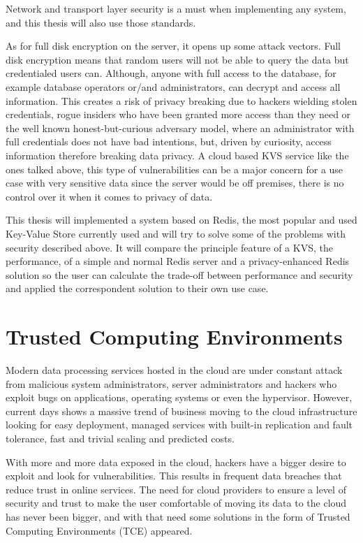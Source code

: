 Network and transport layer security is a must when implementing any system, and this thesis will also use those standards. 

As for full disk encryption on the server, it opens up some attack vectors. Full disk encryption means that random users will not be able to query the data but credentialed users can. Although, anyone with full access to the database, for example database operators or/and administrators, can decrypt and access all information. This creates a risk of privacy breaking due to hackers wielding stolen credentials, rogue insiders who have been granted more access than they need or the well known honest-but-curious adversary model, where an administrator with full credentials does not have bad intentions, but, driven by curiosity, access information therefore breaking data privacy. A cloud based \gls{KVS} service like the ones talked above, this type of vulnerabilities can be a major concern for a use case with very sensitive data since the server would be off premises, there is no control over it when it comes to privacy of data.

This thesis will implemented a system based on Redis, the most popular and used Key-Value Store currently used and will try to solve some of the problems with security described above. It will compare the principle feature of a \gls{KVS}, the performance, of a simple and normal Redis server and a privacy-enhanced Redis solution so the user can calculate the trade-off between performance and security and applied the correspondent solution to their own use case.

\section{Trusted  Computing Environments} %
\label{sec:trusted_computing _environments}

Modern data processing services hosted in the cloud are under constant attack from malicious system administrators, server administrators and hackers who exploit bugs on applications, operating systems or even the hypervisor. However, current days shows a massive trend of business moving to the cloud infrastructure looking for easy deployment, managed services with built-in replication and fault tolerance, fast and trivial scaling and predicted costs.

With more and more data exposed in the cloud, hackers have a bigger desire to exploit and look for vulnerabilities. This results in frequent data breaches that reduce trust in online services. The need for cloud providers to ensure a level of security and trust to make the user comfortable of moving its data to the cloud has never been bigger, and with that need some solutions in the form of Trusted Computing Environments (\gls{TCE}) appeared.

